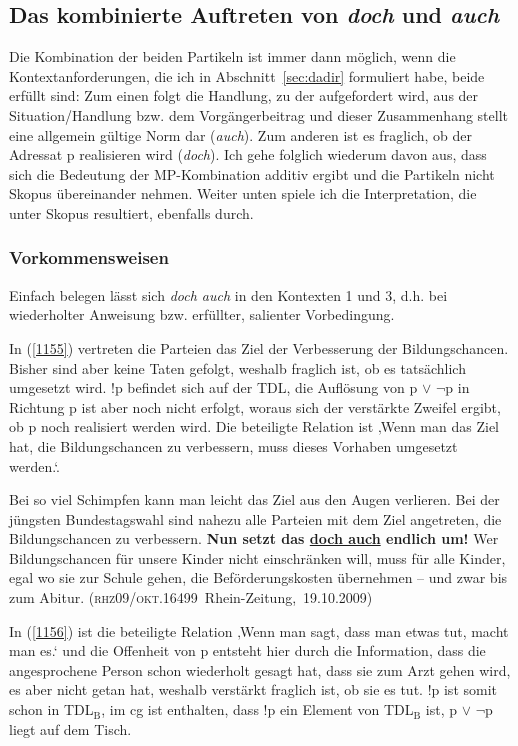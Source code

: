 \subsection{Das kombinierte Auftreten von \textit{doch} und \textit{auch}}
\label{sec:kombida}
Die Kombination der beiden Partikeln ist immer dann möglich, wenn die Kontextanforderungen, die ich in Abschnitt~\ref{sec:dadir} formuliert habe, beide erfüllt sind: Zum einen folgt die Handlung, zu der aufgefordert wird, aus der Situation/Handlung bzw. dem Vorgängerbeitrag und dieser Zusammenhang stellt eine allgemein gültige Norm dar (\textit{auch}). Zum anderen ist es fraglich, ob der Adressat p realisieren wird (\textit{doch}). Ich gehe folglich wiederum davon aus, dass sich die Bedeutung der MP-Kombination additiv ergibt und die Partikeln nicht Skopus  übereinander nehmen. Weiter unten spiele ich die Interpretation, die unter Skopus resultiert, ebenfalls durch.

\subsubsection{Vorkommensweisen}
Einfach belegen lässt sich \textit{doch auch} in den Kontexten 1 und 3, d.h. bei wiederholter Anweisung bzw. erfüllter, salienter Vorbedingung.

In (\ref{1155}) vertreten die Parteien das Ziel der Verbesserung der Bildungschancen. Bisher sind aber keine Taten gefolgt, weshalb fraglich ist, ob es tatsächlich umgesetzt wird. !p befindet sich auf der TDL, die Auflösung von p $\vee$ $\neg$p in Richtung p ist aber noch nicht erfolgt, woraus sich der verstärkte Zweifel ergibt, ob p noch realisiert werden wird. Die beteiligte Relation ist ‚Wenn man das Ziel hat, die Bildungschancen zu verbessern, muss dieses Vorhaben umgesetzt werden.‘.

\begin{exe}
	\ex\label{1155} 

	Bei so viel Schimpfen kann man leicht das Ziel aus den Augen verlieren. Bei der jüngsten Bundestagswahl sind nahezu alle Parteien mit dem Ziel 				angetreten, die Bildungschancen zu verbessern. \textbf{Nun setzt das \ul{doch auch} endlich um!} Wer Bildungschancen für unsere Kinder nicht 		einschränken will, muss für alle Kinder, egal wo sie zur Schule gehen, die Beförderungskosten übernehmen – und zwar bis zum Abitur. 		
	\newline\hbox{}\hfill\hbox{(\textsc{rhz09/okt.16499} Rhein-Zeitung, 19.10.2009)}
\end{exe}
In (\ref{1156}) ist die beteiligte Relation ‚Wenn man sagt, dass man etwas tut, macht man es.‘ und die Offenheit von p entsteht hier durch die Information, dass die angesprochene Person schon wiederholt gesagt hat, dass sie zum Arzt gehen wird, es aber nicht getan hat, weshalb verstärkt fraglich ist, ob sie es tut. !p ist somit schon in TDL$_{\textrm{B}}$, im cg ist enthalten, dass !p ein Element von TDL$_{\textrm{B}}$ ist, p $\vee$ $\neg$p liegt auf dem Tisch.

